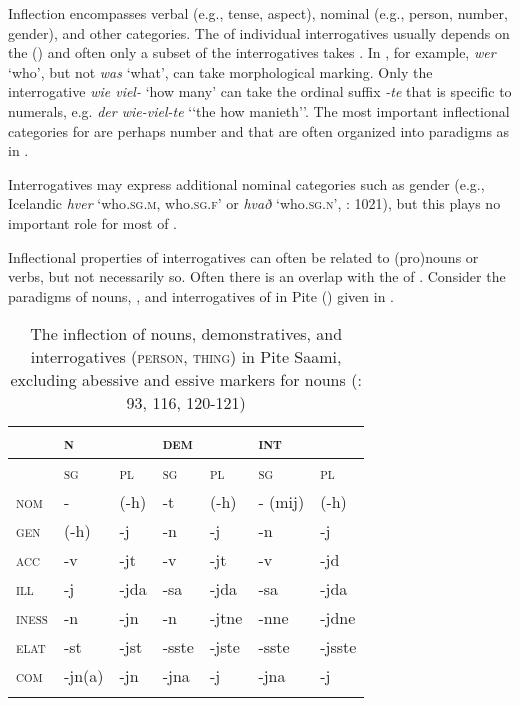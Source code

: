 Inflection encompasses verbal (e.g., tense, aspect), nominal (e.g., person, number, gender), and other categories. The  of individual interrogatives usually depends on the  () and often only a subset of the interrogatives takes . In , for example, \textit{wer} ‘who’, but not \textit{was} ‘what’, can take morphological  marking. Only the interrogative \textit{wie viel-} ‘how many’ can take the ordinal suffix \textit{-te} that is specific to numerals, e.g. \textit{der wie-viel-te} ‘‘the how manieth’’. The most important inflectional categories for  are perhaps number and  that are often organized into paradigms as in .

Interrogatives may express additional nominal categories such as gender (e.g., Icelandic \textit{hver} ‘who\textsc{.sg}.\textsc{m}, who\textsc{.sg}.\textsc{f}’ or \textit{hvað} ‘who\textsc{.sg}.\textsc{n}’, \citealt{Siemund2001}: 1021), but this plays no important role for most of .

Inflectional properties of interrogatives can often be related to (pro)nouns or verbs, but not necessarily so. Often there is an overlap with the  of . Consider the paradigms of nouns, , and interrogatives of in Pite  () given in .

\begin{table}
\caption{The inflection of nouns, demonstratives, and interrogatives (\textsc{person}, \textsc{thing}) in Pite Saami, excluding abessive and essive markers for nouns (\citealt{Wilbur2014}: 93, 116, 120-121)}
\label{tab:4:14}

\begin{tabularx}{.8\textwidth}{XlXlXll}
\lsptoprule
& \textsc{n} &  & \textsc{dem} &  & \textsc{int} & \\
\midrule
& \textsc{sg} & \textsc{pl} & \textsc{sg} & \textsc{pl} & \textsc{sg} & \textsc{pl}\\
\textsc{nom} & - & (-h) & -t & (-h) & - (mij) & (-h)\\
\textsc{gen} & (-h) & -j & -n & -j & -n & -j\\
\textsc{acc} & -v & -jt & -v & -jt & -v & -jd\\
\textsc{ill} & -j & -jda & -sa & -jda & -sa & -jda\\
\textsc{iness} & -n & -jn & -n & -jtne & -nne & -jdne\\
\textsc{elat} & -st & -jst & -sste & -jste & -sste & -jsste\\
\textsc{com} & -jn(a) & -jn & -jna & -j & -jna & -j\\
\lspbottomrule
\end{tabularx}
\end{table}

